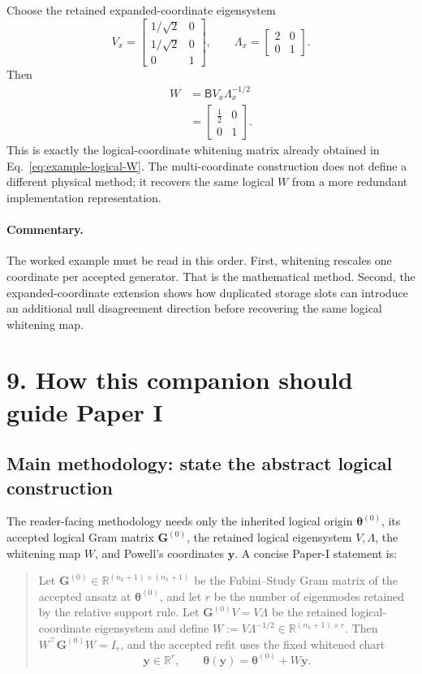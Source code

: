\documentclass[11pt]{article}
\newcommand{\commentary}{\paragraph{Commentary.}}
\begin{document}
Choose the retained expanded-coordinate eigensystem
\begin{equation}
V_x
=
\begin{bmatrix}
1/\sqrt2&0\\
1/\sqrt2&0\\
0&1
\end{bmatrix},
\qquad
\Lambda_x
=
\begin{bmatrix}
2&0\\
0&1
\end{bmatrix}.
\label{eq:example-expanded-eigensystem}
\end{equation}
Then
\begin{align}
W
&=
\mathsf B V_x\Lambda_x^{-1/2}\nonumber\\
&=
\begin{bmatrix}
\tfrac12&0\\
0&1
\end{bmatrix}.
\label{eq:example-expanded-W}
\end{align}
This is exactly the logical-coordinate whitening matrix already obtained in
Eq.~\eqref{eq:example-logical-W}.  The multi-coordinate construction does not
define a different physical method; it recovers the same logical \(W\) from a
more redundant implementation representation.

\commentary The worked example must be read in this order.  First, whitening
rescales one coordinate per accepted generator.  That is the mathematical
method.  Second, the expanded-coordinate extension shows how duplicated
storage slots can introduce an additional null disagreement direction before
recovering the same logical whitening map.

\section*{9. How this companion should guide Paper I}

\subsection*{Main methodology: state the abstract logical construction}

The reader-facing methodology needs only the inherited logical origin
\(\boldsymbol\theta^{(0)}\), its accepted logical Gram matrix
\(\mathbf G^{(0)}\), the retained logical eigensystem \(V,\Lambda\), the
whitening map \(W\), and Powell's coordinates \(\mathbf y\).  A concise
Paper-I statement is:
\begin{quote}
Let \(\mathbf G^{(0)}\in
\mathbb R^{(n_k+1)\times(n_k+1)}\) be the Fubini--Study Gram matrix of the
accepted ansatz at \(\boldsymbol\theta^{(0)}\), and let \(r\) be the number of
eigenmodes retained by the relative support rule.  Let
\(\mathbf G^{(0)}V=V\Lambda\) be the retained logical-coordinate
eigensystem and define
\(W:=V\Lambda^{-1/2}\in
\mathbb R^{(n_k+1)\times r}\).  Then
\(W^\top\mathbf G^{(0)}W=I_r\), and the accepted refit uses the fixed
whitened chart
\[
\mathbf y\in\mathbb R^r,\qquad
\boldsymbol\theta(\mathbf y)
=\boldsymbol\theta^{(0)}+W\mathbf y.
\]
\end{quote}
\end{document}
